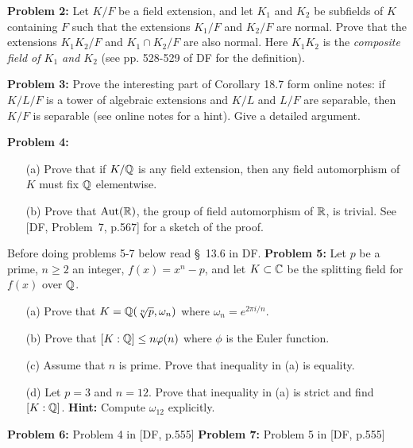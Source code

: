 \documentclass[12pt]{amsart}
\begin{document}
{\bf Problem 2:} Let $K/F$ be a field extension, and let $K_1$ and $K_2$
be subfields of $K$ containing $F$ such that the extensions
$K_1/F$ and $K_2/F$ are normal. Prove that the extensions
$K_1 K_2/F$ and $K_1\cap K_2/F$ are also normal.
Here $K_1 K_2$ is the {\it composite field of $K_1$ and $K_2$} (see  pp. 528-529 of DF for the definition).
\skv

\skv
{\bf Problem 3:} \rm
Prove the interesting part of Corollary 18.7 form online notes: if $K/L/F$ is a tower of algebraic extensions and $K/L$ and $L/F$ are separable, then $K/F$ is separable (see online notes for a hint). Give a detailed argument.
\skv

{\bf Problem 4:} 
\begin{itemize}
\item[(a)] Prove that if  $K/{\mathbb Q}$ is any field extension,
then any field automorphism of $K$ must fix ${\mathbb Q}$ elementwise.

\item[(b)] Prove that ${\rm Aut}({\mathbb R})$, the group of field automorphism of ${\mathbb R}$, is trivial.
See [DF, Problem~7, p.567] for a sketch of the proof.
\end{itemize}
\skv
Before doing problems 5-7 below read \S~13.6 in DF.
\skv
{\bf Problem 5:} \rm 
Let $p$ be a prime, $n\geq 2$ an integer, $f(x)=x^n-p$, and let
$K\subset {\mathbb C}$ be the splitting field for $f(x)$ over ${\mathbb Q}$.
\begin{itemize}
\item[(a)] Prove that $K={\mathbb Q}(\sqrt[n]{p},\omega_n)$ where
$\omega_n=e^{2\pi i/n}$.
\item[(b)] Prove that $[K:{\mathbb Q}]\leq n\varphi(n)$ where $\phi$
is the Euler function.
\item[(c)] Assume that $n$ is prime. Prove that inequality in (a)
is equality.
\item[(d)] Let $p=3$ and $n=12$. Prove that inequality in (a)
is strict and find $[K:{\mathbb Q}]$. {\bf Hint:} Compute $\omega_{12}$
explicitly.
\end{itemize}
\skv
{\bf Problem 6:} Problem 4 in [DF, p.555]
\skv
{\bf Problem 7:} Problem 5 in [DF, p.555]
\end{document}
